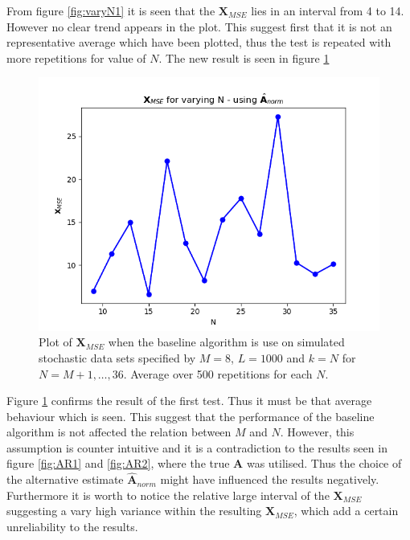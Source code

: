 From figure \ref{fig:varyN1} it is seen that the $\textbf{X}_{MSE}$ lies in an interval from 4 to 14. However no clear trend appears in the plot. This suggest first that it is not an representative average which have been plotted, thus the test is repeated with more repetitions for value of $N$. The new result is seen in figure \ref{fig:varyN2}

\begin{figure}[H]
    \centering
	\includegraphics[scale=0.5]{figures/ch_6/varyN2.png}
	\caption{Plot of $\textbf{X}_{MSE}$ when the baseline algorithm is use on simulated stochastic data sets specified by $M = 8$, $L=1000$ and $k = N$ for $N = M+1, \hdots , 36$. Average over 500 repetitions for each $N$.}
	\label{fig:varyN2}
\end{figure}  
Figure \ref{fig:varyN2} confirms the result of the first test. Thus it must be that average behaviour which is seen. This suggest that the performance of the baseline algorithm is not affected the relation between $M$ and $N$.
However, this assumption is counter intuitive and it is a contradiction to the results seen in figure \ref{fig:AR1} and \ref{fig:AR2}, where the true $\textbf{A}$ was utilised. Thus the choice of the alternative estimate $\hat{\textbf{A}}_{norm}$ might have influenced the results negatively.  
Furthermore it is worth to notice the relative large interval of the $\textbf{X}_{MSE}$ suggesting a vary high variance within the resulting $\textbf{X}_{MSE}$, which add a certain unreliability to the results.    




